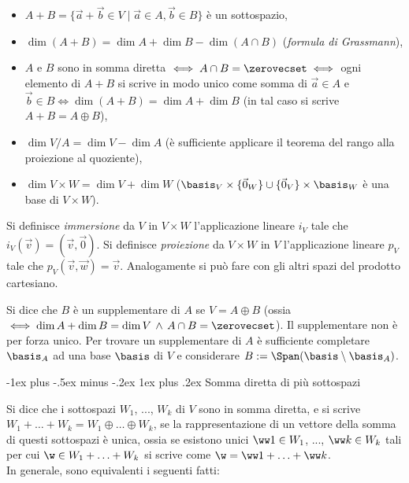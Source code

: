 \documentclass[10pt,landscape]{article}
\makeatletter
\renewcommand{\subsubsection}{\@startsection{subsubsection}{3}{0mm}%
	{-1ex plus -.5ex minus -.2ex}%
	{1ex plus .2ex}%
	{\normalfont\small\bfseries}}
\makeatother
\begin{document}
\begin{multicols}{3}
		\begin{itemize}
			\item $A+B = \{\vec{a}+\vec{b} \in V \mid \vec{a} \in A, \vec{b} \in
			B\}$ è un sottospazio,
			\item $\dim (A+B) = \dim A + \dim B - \dim (A \cap B)$
			(\textit{formula di Grassmann}),
			\item $A$ e $B$ sono in somma diretta $\iff A \cap B = \zerovecset \iff$ ogni elemento di $A+B$ si scrive in modo unico come somma di
			$\vec{a} \in A$ e $\vec{b} \in B \iff \dim (A+B) = \dim A + \dim B$
			(in tal caso si scrive $A+B = A\oplus B$),
			\item $\dim V/A = \dim V - \dim A$ (è sufficiente applicare il
			teorema del rango alla proiezione al quoziente),
			\item $\dim V \times W = \dim V + \dim W$ ($\basis_V \times \{\vec{0}_W\} \cup \{\vec{0}_V\} \times \basis_W$ è una base
			di $V \times W$).
		\end{itemize}
		
		Si definisce \textit{immersione} da $V$ in $V \times W$
		l'applicazione lineare $i_V$ tale che $i_V(\vec{v}) = (\vec{v}, \vec{0})$.
		Si definisce \textit{proiezione} da $V \times W$ in $V$
		l'applicazione lineare $p_V$ tale che $p_V(\vec{v}, \vec{w}) = \vec{v}$.
		Analogamente si può fare con gli altri spazi del prodotto cartesiano.
		
		Si dice che $B$ è un supplementare di $A$ se $V = A \oplus B$ (ossia $\iff
		\dim A + \dim B = \dim V \, \land \, A \cap B = \zerovecset$). Il supplementare
		non è per forza unico. Per trovare un supplementare di $A$ è sufficiente
		completare $\basis_A$ ad una base $\basis$ di $V$ e considerare
		$B := \Span(\basis \setminus \basis_A)$.
		
		\subsubsection{Somma diretta di più sottospazi}
		
		Si dice che i sottospazi $W_1$, ..., $W_k$ di $V$ sono in somma
		diretta, e si scrive $W_1 + \ldots + W_k = W_1 \oplus \ldots \oplus W_k$,
		se la rappresentazione di un vettore della somma di questi sottospazi
		è unica, ossia se esistono unici $\ww 1 \in W_1$, ..., $\ww k \in W_k$ tali
		per cui $\w \in W_1 + \ldots + W_k$ si scrive come $\w = \ww 1 + \ldots + \ww k$. \\
		
		In generale, sono equivalenti i seguenti fatti:
		

\end{multicols}
\end{document}
